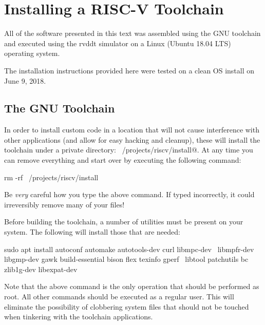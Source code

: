 \chapter{Installing a RISC-V Toolchain}
\label{chapter:install}

All of the software presented in this text was assembled using the
GNU toolchain and executed using the rvddt simulator on a Linux
(Ubuntu 18.04 LTS) operating system.

The installation instructions provided here were tested on a
clean OS install on June 9, 2018.

\section{The GNU Toolchain}

%
In order to install custom code in a location that will not cause 
interference with other applications (and allow for easy hacking and
cleanup), these will install the toolchain under
a private directory: \verb@~/projects/riscv/install@.  At any time
you can remove everything and start over by executing the following 
command:

\begin{tty}
rm -rf ~/projects/riscv/install
\end{tty}

\begin{tcolorbox}
Be {\em very} careful how you type the above \verb@rm@ command.  
If typed incorrectly, it could irreversibly remove many of your files!
\end{tcolorbox}

Before building the toolchain, a number of utilities must be present on 
your system.  The following will install those that are needed:

\begin{tty}
sudo apt install autoconf automake autotools-dev curl libmpc-dev \
    libmpfr-dev libgmp-dev gawk build-essential bison flex texinfo gperf \
    libtool patchutils bc zlib1g-dev libexpat-dev
\end{tty}

Note that the above \verb@apt@ command is the only operation that should
be performed as root.  All other commands should be executed as a regular 
user.  This will eliminate the possibility of clobbering system files that 
should not be touched when tinkering with the toolchain applications.

